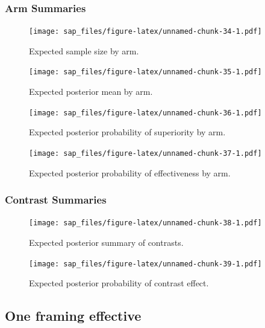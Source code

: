 \documentclass[
  bibliography=totoc]{scrreprt}
\begin{document}
\hypertarget{arm-summaries-2}{%
\subsubsection{Arm Summaries}\label{arm-summaries-2}}

\begin{figure}
\centering
\texttt{[image: sap\_files/figure-latex/unnamed-chunk-34-1.pdf]}
\caption{\label{fig:unnamed-chunk-34}Expected sample size by arm.}
\end{figure}

\begin{figure}
\centering
\texttt{[image: sap\_files/figure-latex/unnamed-chunk-35-1.pdf]}
\caption{\label{fig:unnamed-chunk-35}Expected posterior mean by arm.}
\end{figure}

\begin{figure}
\centering
\texttt{[image: sap\_files/figure-latex/unnamed-chunk-36-1.pdf]}
\caption{\label{fig:unnamed-chunk-36}Expected posterior probability of superiority by arm.}
\end{figure}

\begin{figure}
\centering
\texttt{[image: sap\_files/figure-latex/unnamed-chunk-37-1.pdf]}
\caption{\label{fig:unnamed-chunk-37}Expected posterior probability of effectiveness by arm.}
\end{figure}

\clearpage

\hypertarget{contrast-summaries-2}{%
\subsubsection{Contrast Summaries}\label{contrast-summaries-2}}

\begin{figure}
\centering
\texttt{[image: sap\_files/figure-latex/unnamed-chunk-38-1.pdf]}
\caption{\label{fig:unnamed-chunk-38}Expected posterior summary of contrasts.}
\end{figure}

\begin{figure}
\centering
\texttt{[image: sap\_files/figure-latex/unnamed-chunk-39-1.pdf]}
\caption{\label{fig:unnamed-chunk-39}Expected posterior probability of contrast effect.}
\end{figure}

\clearpage

\hypertarget{one-framing-effective}{%
\subsection{One framing effective}\label{one-framing-effective}}
\end{document}
